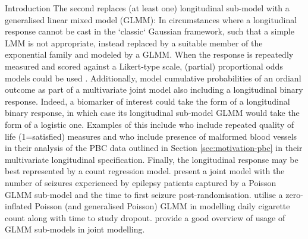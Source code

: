 \begin{chapter}{\label{cha:intro}Introduction}
  The second replaces (at least one) longitudinal sub-model with a generalised linear mixed model (GLMM): In circumstances where a longitudinal response cannot be cast in the `classic` Gaussian framework, such that a simple LMM is not appropriate, instead replaced by a suitable member of the exponential family and modeled by a GLMM. When the response is repeatedly measured and scored against a Likert-type scale, (partial) proportional odds models could be used \citep{Li2010, Alam2021}. Additionally, \citet{He2013} model cumulative probabilities of an ordianl outcome as part of a multivariate joint model also including a longitudinal binary response. Indeed, a biomarker of interest could take the form of a longitudinal binary response, in which case its longitudinal sub-model GLMM would take the form of a logistic one. Examples of this include \citet{Choi2015} who include repeated quality of life (1=satisfied) measures and \citet{Rustand2023} who include presence of malformed blood vessels in their analysis of the PBC data outlined in Section \ref{sec:motivation-pbc} in their multivariate longitudinal specification. Finally, the longitudinal response may be best represented by a count regression model. \citet{Sunethra2018} present a joint model with the number of seizures experienced by epilepsy patients captured by a Poisson GLMM sub-model and the time to first seizure post-randomisation. \citet{Zhu2018} utilise a zero-inflated Poisson (and generalised Poisson) GLMM in modelling daily cigarette count along with time to study dropout. \citet{Hickey2016} provide a good overview of usage of GLMM sub-models in joint modelling.


\end{chapter}
